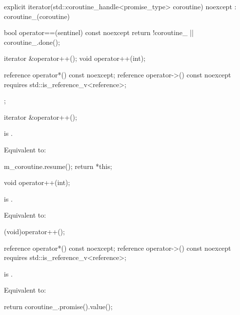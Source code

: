 \documentclass{wg21}
\begin{document}
\begin{addedblock}
\begin{codeblock}
{    explicit iterator(std::coroutine_handle<promise_type> coroutine) noexcept
    : coroutine_(coroutine) {}
    
    bool operator==(sentinel) const noexcept {
         return !coroutine_ || coroutine_.done();
    }
    
    iterator &operator++();
    void operator++(int);
    
    reference operator*() const noexcept;
    reference operator->() const noexcept requires std::is_reference_v<reference>;
    
}; 

\end{codeblock}

\begin{itemdecl}
iterator &operator++();
\end{itemdecl}

\begin{itemdescr}
    \precondition {} is .
    
    \effects
    Equivalent to:
    \begin{codeblock}
     m_coroutine.resume();
     return *this;
    \end{codeblock}
\end{itemdescr}


\begin{itemdecl}
void operator++(int);
\end{itemdecl}

\begin{itemdescr}
    \precondition {} is .
    
    \effects
    Equivalent to:
    \begin{codeblock}
         (void)operator++();
    \end{codeblock}
\end{itemdescr}


\begin{itemdecl}
reference operator*() const noexcept;
reference operator->() const noexcept requires std::is_reference_v<reference>;
\end{itemdecl}

\begin{itemdescr}
    \precondition {} is .
    
    \effects
    Equivalent to:
    \begin{codeblock}
        return coroutine_.promise().value();
    \end{codeblock}
\end{itemdescr}



\end{addedblock}
    
\end{document}
